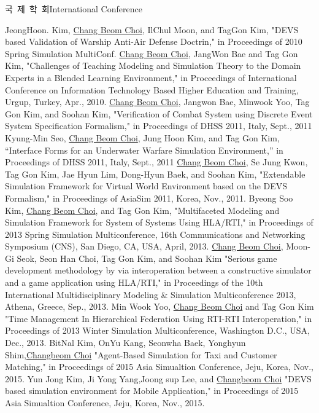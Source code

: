 \documentclass[english,representative]{resume_structure}
\begin{document}
\begin{Publication}
{국\ 제\ 학\ 회}{International Conference}
{}{} 
{
\begin{itemize}
   {JeongHoon. Kim, \underline{Chang Beom Choi}, IlChul Moon, and TagGon Kim, "DEVS based Validation of Warship Anti-Air Defense Doctrin," in Proceedings of 2010 Spring Simulation MultiConf.}
   {\underline{Chang Beom Choi}, JangWon Bae and Tag Gon Kim, "Challenges of Teaching Modeling and Simulation Theory to the Domain Experts in a Blended Learning Environment," in Proceedings of International Conference on Information Technology Based Higher Education and Training, Urgup, Turkey, Apr., 2010.}
   {\underline{Chang Beom Choi}, Jangwon Bae, Minwook Yoo, Tag Gon Kim, and Soohan Kim, "Verification of Combat System using Discrete Event System Specification Formalism," in Proceedings of DHSS 2011, Italy, Sept., 2011}
   {Kyung-Min Seo, \underline{Chang Beom Choi}, Jung Hoon Kim, and Tag Gon Kim, “Interface Forms for an Underwater Warfare Simulation Environment,” in Proceedings of DHSS 2011, Italy, Sept., 2011}
   {\underline{Chang Beom Choi}, Se Jung Kwon, Tag Gon Kim, Jae Hyun Lim, Dong-Hyun Baek, and Soohan Kim, "Extendable Simulation Framework for Virtual World Environment based on the DEVS Formalism," in Proceedings of AsiaSim 2011, Korea, Nov., 2011.}
   {Byeong Soo Kim, \underline{Chang Beom Choi}, and Tag Gon Kim, "Multifaceted Modeling and Simulation Framework for System of Systems Using HLA/RTI," in Proceedings of 2013 Spring Simulation Multiconference, 16th Communications and Networking Symposium (CNS), San Diego, CA, USA, April, 2013.}
   {\underline{Chang Beom Choi}, Moon-Gi Seok, Seon Han Choi, Tag Gon Kim, and Soohan Kim "Serious game development methodology by via interoperation between a constructive simulator and a game application using HLA/RTI," in Proceedings of the 10th International Multidisciplinary Modeling \& Simulation Multiconference 2013, Athena, Greece, Sep., 2013.}
   {Min Wook Yoo, \underline{Chang Beom Choi} and Tag Gon Kim "Time Management In Hierarchical Federation Using RTI-RTI Interoperation," in Proceedings of 2013 Winter Simulation Multiconference, Washington D.C., USA, Dec., 2013.}
   {BitNal Kim, OnYu Kang, Seonwha Baek, Yonghyun Shim,\underline{Changbeom Choi} "Agent-Based Simulation for Taxi and Customer Matching," in Proceedings of 2015 Asia Simualtion Conference, Jeju, Korea, Nov., 2015.}
   {Yun Jong Kim, Ji Yong Yang,Joong sup Lee, and \underline{Changbeom Choi} "DEVS based simulation environment for Mobile Application," in Proceedings of 2015 Asia Simualtion Conference, Jeju, Korea, Nov., 2015.}
\end{itemize}
}
\end{Publication}
\end{document}
